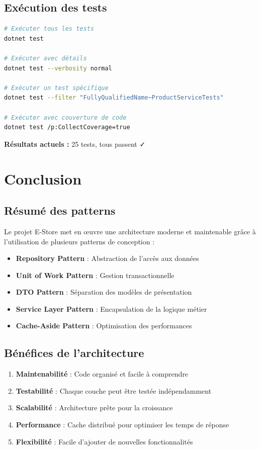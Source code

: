 \documentclass[12pt,a4paper]{article}
\begin{document}
\subsection{Exécution des tests}

\begin{lstlisting}[language=bash, caption=Commandes pour exécuter les tests, float=h!]
# Exécuter tous les tests
dotnet test

# Exécuter avec détails
dotnet test --verbosity normal

# Exécuter un test spécifique
dotnet test --filter "FullyQualifiedName~ProductServiceTests"

# Exécuter avec couverture de code
dotnet test /p:CollectCoverage=true
\end{lstlisting}

\textbf{Résultats actuels :} 25 tests, tous passent ✓

\section{Conclusion}

\subsection{Résumé des patterns}

Le projet E-Store met en œuvre une architecture moderne et maintenable grâce à l'utilisation de plusieurs patterns de conception :

\begin{itemize}
    \item \textbf{Repository Pattern} : Abstraction de l'accès aux données
    \item \textbf{Unit of Work Pattern} : Gestion transactionnelle
    \item \textbf{DTO Pattern} : Séparation des modèles de présentation
    \item \textbf{Service Layer Pattern} : Encapsulation de la logique métier
    \item \textbf{Cache-Aside Pattern} : Optimisation des performances
\end{itemize}

\subsection{Bénéfices de l'architecture}

\begin{enumerate}
    \item \textbf{Maintenabilité} : Code organisé et facile à comprendre
    \item \textbf{Testabilité} : Chaque couche peut être testée indépendamment
    \item \textbf{Scalabilité} : Architecture prête pour la croissance
    \item \textbf{Performance} : Cache distribué pour optimiser les temps de réponse
    \item \textbf{Flexibilité} : Facile d'ajouter de nouvelles fonctionnalités
\end{enumerate}
\end{document}
